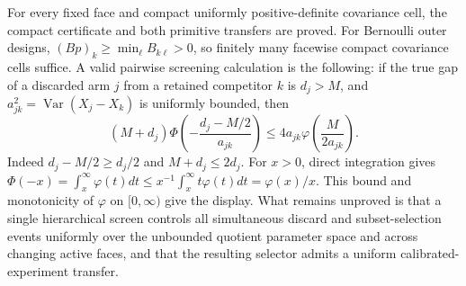 For every fixed face and compact uniformly positive-definite covariance cell, the compact certificate and both primitive transfers are proved.  For Bernoulli outer designs, \((Bp)_k\geq\min_\ell B_{k\ell}>0\), so finitely many facewise compact covariance cells suffice.  A valid pairwise screening calculation is the following: if the true gap of a discarded arm \(j\) from a retained competitor \(k\) is \(d_j>M\), and \(a_{jk}^2=\operatorname{Var}(X_j-X_k)\) is uniformly bounded, then
\[
(M+d_j)\Phi\!\left(-\frac{d_j-M/2}{a_{jk}}\right)
\leq4a_{jk}\varphi\!\left(\frac{M}{2a_{jk}}\right).
\]
Indeed \(d_j-M/2\geq d_j/2\) and \(M+d_j\leq2d_j\).  For \(x>0\), direct integration gives \(\Phi(-x)=\int_x^\infty\varphi(t)dt\leq x^{-1}\int_x^\infty t\varphi(t)dt=\varphi(x)/x\).  This bound and monotonicity of \(\varphi\) on \([0,\infty)\) give the display.  What remains unproved is that a single hierarchical screen controls all simultaneous discard and subset-selection events uniformly over the unbounded quotient parameter space and across changing active faces, and that the resulting selector admits a uniform calibrated-experiment transfer.